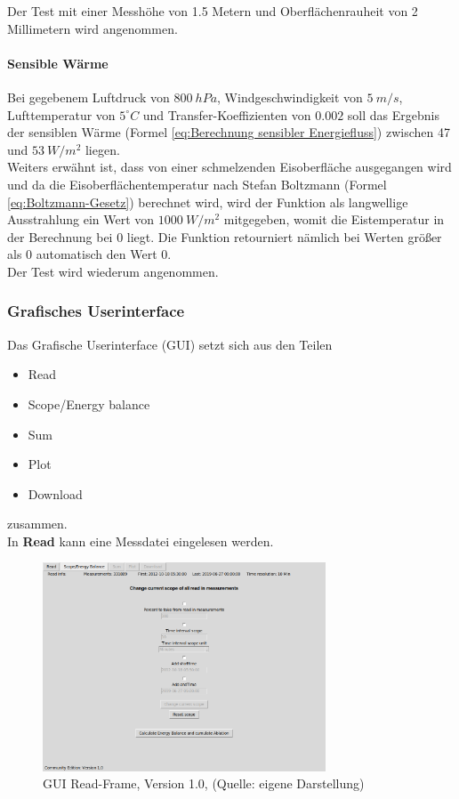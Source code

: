 \documentclass[11pt,a4paper]{article}
\newcommand{\guiplotsize}{0.75}
\newcommand{\guiversion}{1.0}
\begin{document}
Der Test mit einer Messhöhe von 1.5 Metern und Oberflächenrauheit von 2 Millimetern wird angenommen.

\paragraph{Sensible Wärme}
Bei gegebenem Luftdruck von $800~hPa$, Windgeschwindigkeit von $5~m/s$, Lufttemperatur von $5^\circ C$ und Transfer-Koeffizienten von $0.002$ soll das Ergebnis der sensiblen Wärme (Formel \ref{eq:Berechnung sensibler Energiefluss}) zwischen 47 und $53~W/m^2$ liegen. \\
Weiters erwähnt ist, dass von einer schmelzenden Eisoberfläche ausgegangen wird und da die Eisoberflächentemperatur nach Stefan Boltzmann (Formel \ref{eq:Boltzmann-Gesetz}) berechnet wird, wird der Funktion als langwellige Ausstrahlung ein Wert von $1000~W/m^2$ mitgegeben, womit die Eistemperatur in der Berechnung bei 0 liegt. Die Funktion retourniert nämlich bei Werten größer als 0 automatisch den Wert 0.\\

Der Test wird wiederum angenommen.

\subsubsection{Grafisches Userinterface}
Das Grafische Userinterface (GUI) setzt sich aus den Teilen 
\begin{itemize}
\item Read
\item Scope/Energy balance
\item Sum
\item Plot
\item Download
\end{itemize}
zusammen.\\

In \textbf{Read} kann eine Messdatei eingelesen werden. 

\begin{figure}[H]
\centering
\includegraphics[width=\guiplotsize\textwidth]{pictures/GUI/Read_Frame.png}
\caption[GUI Read-Frame, Version \guiversion]{GUI Read-Frame, Version \guiversion, (Quelle: eigene Darstellung)}
\label{fig:GUI Read-Frame}
\end{figure}
\end{document}
